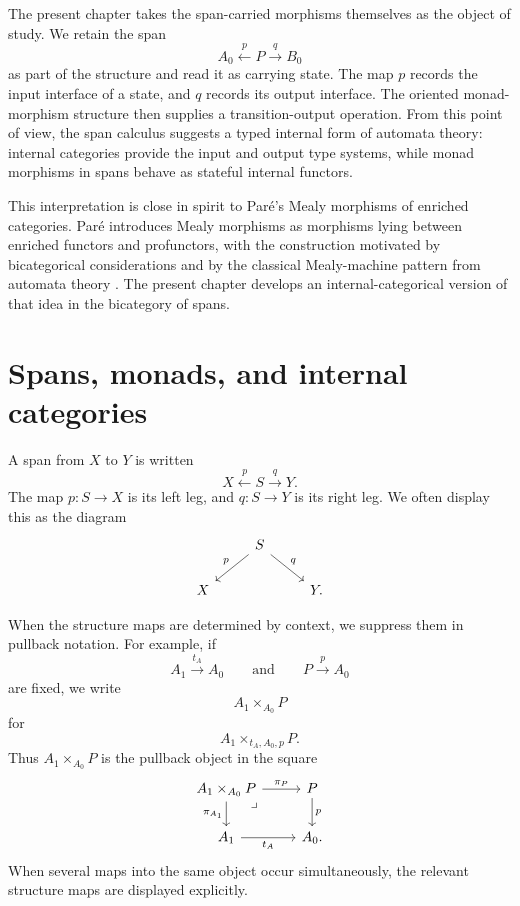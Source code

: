 The present chapter takes the span-carried morphisms themselves as the object of study. We retain the span
\[
    A_0 \xleftarrow{p} P \xrightarrow{q} B_0
\]
as part of the structure and read it as carrying state. The map \(p\) records the input interface of a state, and \(q\) records its output interface. The oriented monad-morphism structure then supplies a transition-output operation. From this point of view, the span calculus suggests a typed internal form of automata theory: internal categories provide the input and output type systems, while monad morphisms in spans behave as stateful internal functors.

This interpretation is close in spirit to Par\'e's Mealy morphisms of enriched categories. Par\'e introduces Mealy morphisms as morphisms lying between enriched functors and profunctors, with the construction motivated by bicategorical considerations and by the classical Mealy-machine pattern from automata theory \cite{PareMealyMorphisms}. The present chapter develops an internal-categorical version of that idea in the bicategory of spans.

\section{Spans, monads, and internal categories}
\label{sec:spans-monads-internal-categories}

A span from \(X\) to \(Y\) is written
\[
    X \xleftarrow{p} S \xrightarrow{q} Y.
\]
The map \(p:S\to X\) is its left leg, and \(q:S\to Y\) is its right leg. We often display this as the diagram
\[
    \begin{tikzcd}
        & 
            S 
                \arrow[dl, "p"'] 
                \arrow[dr, "q"] 
        & 
        \\
            X 
        &
        & 
            Y.
    \end{tikzcd}
\]

When the structure maps are determined by context, we suppress them in pullback notation. For example, if
\[
    A_1\xrightarrow{t_A}A_0
    \qquad\text{and}\qquad
    P\xrightarrow{p}A_0
\]
are fixed, we write
\[
    A_1\times_{A_0}P
\]
for
\[
    A_1\times_{t_A,A_0,p}P.
\]
Thus \(A_1\times_{A_0}P\) is the pullback object in the square
\[
    \begin{tikzcd}
            A_1\times_{A_0}P
                \arrow[r, "\pi_P"]
                \arrow[d, "\pi_{A_1}"']
                \arrow[dr, phantom, "\lrcorner", very near start]
        &
            P
                \arrow[d, "p"]
        \\
            A_1
                \arrow[r, "t_A"']
        &
            A_0.
    \end{tikzcd}
\]
When several maps into the same object occur simultaneously, the relevant structure maps are displayed explicitly.

